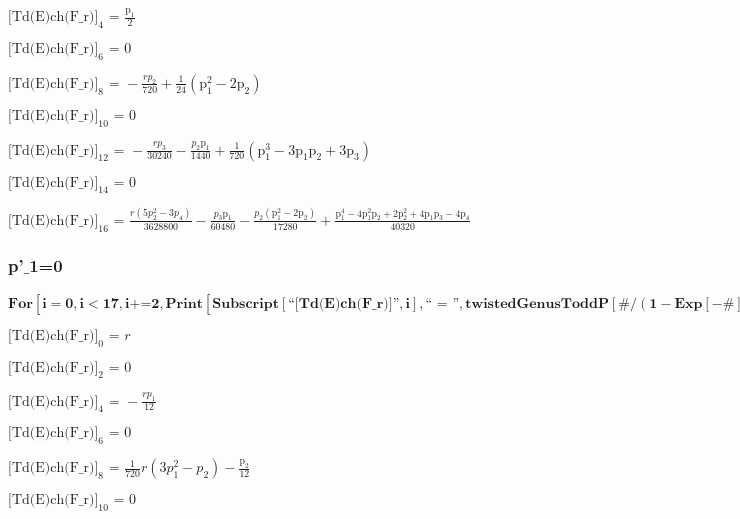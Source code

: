 \documentclass{article}
\newcommand{\unicode}[1]{{}}
\begin{document}
\noindent\(\text{[Td(E)ch(F$\_$r)]}_4\text{ = }\frac{\text{p$\unicode{02bc}$}_1}{2}\)

\noindent\(\text{[Td(E)ch(F$\_$r)]}_6\text{ = }0\)

\noindent\(\text{[Td(E)ch(F$\_$r)]}_8\text{ = }-\frac{r p_2}{720}+\frac{1}{24} \left(\text{p$\unicode{02bc}$}_1^2-2 \text{p$\unicode{02bc}$}_2\right)\)

\noindent\(\text{[Td(E)ch(F$\_$r)]}_{10}\text{ = }0\)

\noindent\(\text{[Td(E)ch(F$\_$r)]}_{12}\text{ = }-\frac{r p_3}{30240}-\frac{p_2 \text{p$\unicode{02bc}$}_1}{1440}+\frac{1}{720} \left(\text{p$\unicode{02bc}$}_1^3-3
\text{p$\unicode{02bc}$}_1 \text{p$\unicode{02bc}$}_2+3 \text{p$\unicode{02bc}$}_3\right)\)

\noindent\(\text{[Td(E)ch(F$\_$r)]}_{14}\text{ = }0\)

\noindent\(\text{[Td(E)ch(F$\_$r)]}_{16}\text{ = }\frac{r \left(5 p_2^2-3 p_4\right)}{3628800}-\frac{p_3 \text{p$\unicode{02bc}$}_1}{60480}-\frac{p_2
\left(\text{p$\unicode{02bc}$}_1^2-2 \text{p$\unicode{02bc}$}_2\right)}{17280}+\frac{\text{p$\unicode{02bc}$}_1^4-4 \text{p$\unicode{02bc}$}_1^2
\text{p$\unicode{02bc}$}_2+2 \text{p$\unicode{02bc}$}_2^2+4 \text{p$\unicode{02bc}$}_1 \text{p$\unicode{02bc}$}_3-4 \text{p$\unicode{02bc}$}_4}{40320}\)

\subsubsection*{p{'}$\_$1=0}

\begin{doublespace}
\noindent\(\pmb{\text{For}\left[i=0,i<17,i\text{+=}2, \text{Print}\left[\text{Subscript}[\text{{``}[Td(E)ch(F$\_$r)]{''}},i],\text{{``} = {''}},\text{twistedGenusToddP}[\#/(1-\text{Exp}[-\#])\&,i]\text{/.}\text{p$\unicode{02bc}$}_1\to
0\right]\right]}\)
\end{doublespace}

\noindent\(\text{[Td(E)ch(F$\_$r)]}_0\text{ = }r\)

\noindent\(\text{[Td(E)ch(F$\_$r)]}_2\text{ = }0\)

\noindent\(\text{[Td(E)ch(F$\_$r)]}_4\text{ = }-\frac{r p_1}{12}\)

\noindent\(\text{[Td(E)ch(F$\_$r)]}_6\text{ = }0\)

\noindent\(\text{[Td(E)ch(F$\_$r)]}_8\text{ = }\frac{1}{720} r \left(3 p_1^2-p_2\right)-\frac{\text{p$\unicode{02bc}$}_2}{12}\)

\noindent\(\text{[Td(E)ch(F$\_$r)]}_{10}\text{ = }0\)
\end{document}
